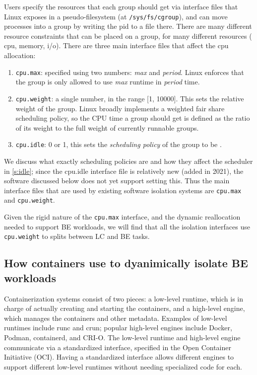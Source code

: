 Users specify the resources that each group should get via interface files that
Linux exposes in a pseudo-filesystem (at \texttt{/sys/fs/cgroup}), and can move
processes into a group by writing the pid to a file there. There are many
different resource constraints that can be placed on a group, for many different
resources (\eg{} cpu, memory, i/o). There are three main interface files that
affect the cpu allocation:
\begin{enumerate}
    \item \texttt{cpu.max}: specified using two numbers: \textit{max} and \textit{period}. Linux
    enforces that the group is only allowed to use \textit{max} runtime in \textit{period} time.
    \item \texttt{cpu.weight}: a single number, in the range [1, 10000]. This
    sets the relative weight of the group. Linux broadly implements a weighted fair
    share scheduling policy, so the CPU time a group should get is defined as
    the ratio of its weight to the full weight of currently runnable groups.
    \item \texttt{cpu.idle}: 0 or 1, this sets the \textit{scheduling policy} of
    the group to be \schedidle{}.
\end{enumerate}

We discuss what exactly scheduling policies are and how they affect the
scheduler in \autoref{s:idle}; since the cpu.idle \cgroups{} interface file is
relatively new (added in 2021), the software discussed below does not yet
support setting this. Thus the main interface files that are used by existing
software isolation systems are \texttt{cpu.max} and \texttt{cpu.weight}.

Given the rigid nature of the \texttt{cpu.max} interface, and the dynamic
reallocation needed to support BE workloads, we will find that all the isolation
interfaces use \texttt{cpu.weight} to splits between LC and BE tasks.

\subsection{How containers use \cgroups{} to dyanimically isolate BE workloads}

Containerization systems consist of two pieces: a low-level runtime, which is in
charge of actually creating and starting the containers, and a high-level
engine, which manages the containers and other metadata. Examples of low-level
runtimes include runc and crun; popular high-level engines include Docker,
Podman, containerd, and CRI-O. The low-level runtime and high-level engine
communicate via a standardized interface, specified in the Open Container
Initiative (OCI). Having a standardized interface allows different engines to
support different low-level runtimes without needing specialized code for each.

